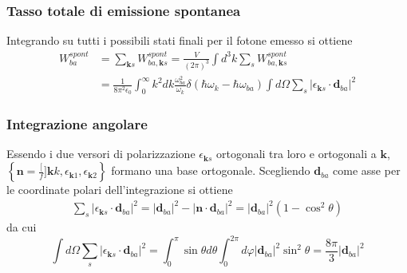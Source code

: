 \documentclass{beamer}
\begin{document}
\begin{frame}
  \frametitle{Tasso totale di emissione spontanea}
  Integrando su tutti i possibili stati finali per il fotone emesso si ottiene
  \begin{align*}
    W_{ba}^{spont} & = \sum_{\mathbf{k}s} W_{ba,\mathbf{k}s}^{spont} = \frac{V}{(2\pi)^3}\int d^3k \sum_s W_{ba,\mathbf{k}s}^{spont}\\
    & = \frac{1}{8\pi^2\epsilon_0} \int_0^{\infty} k^2 dk \frac{\omega_{ba}^2}{\omega_k} \delta(\hbar \omega_k - \hbar \omega_{ba})
    \int d\Omega \sum_s \left|\epsilon_{\mathbf{k}s} \cdot \mathbf{d}_{ba} \right|^2
  \end{align*}

\end{frame}

\begin{frame}
  \frametitle{Integrazione angolare}
  Essendo i due versori di polarizzazione $\epsilon_{\mathbf{k}s}$ ortogonali tra loro e ortogonali a $\mathbf{k}$, $\left\{\mathbf{n}=\frac[f]{\mathbf{k}}{k}, \epsilon_{\mathbf{k}1}, \epsilon_{\mathbf{k}2}\right\}$ formano una base ortogonale. Scegliendo $\mathbf{d}_{ba}$ come asse per le coordinate polari dell'integrazione si ottiene
  \begin{align*}
    \sum_s \left|\epsilon_{\mathbf{k}s} \cdot \mathbf{d}_{ba} \right|^2 = \left| \mathbf{d}_{ba} \right|^2 - \left|\mathbf{n}\cdot \mathbf{d}_{ba}\right|^2
    =  \left| \mathbf{d}_{ba} \right|^2 (1 - \cos^2\theta)
  \end{align*}
  da cui
  \begin{equation*}
    \int d\Omega \sum_s \left|\epsilon_{\mathbf{k}s} \cdot \mathbf{d}_{ba} \right|^2
    = \int_0^{\pi} \sin\theta d\theta \int_0^{2\pi} d\varphi \left| \mathbf{d}_{ba} \right|^2 \sin^2\theta
    = \frac{8\pi}{3} \left| \mathbf{d}_{ba} \right|^2
  \end{equation*}
\end{frame}
\end{document}

